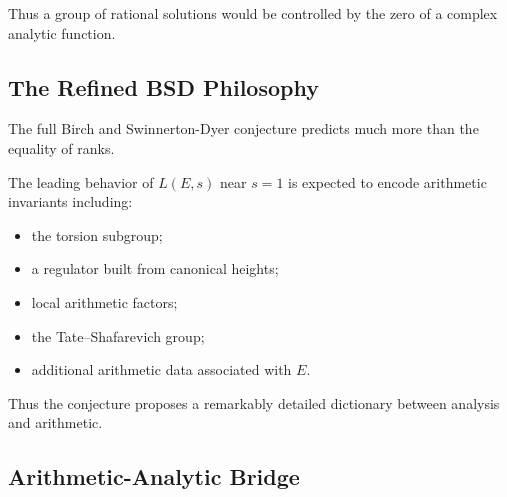 Thus a group of rational solutions would be controlled by the zero of a
complex analytic function.

\subsection{The Refined BSD Philosophy}
\label{subsec:refined-bsd-philosophy}

The full Birch and Swinnerton-Dyer conjecture predicts much more than the
equality of ranks.

The leading behavior of \(L(E,s)\) near \(s=1\) is expected to encode
arithmetic invariants including:

\begin{itemize}
    \item the torsion subgroup;
    \item a regulator built from canonical heights;
    \item local arithmetic factors;
    \item the Tate--Shafarevich group;
    \item additional arithmetic data associated with \(E\).
\end{itemize}

Thus the conjecture proposes a remarkably detailed dictionary between
analysis and arithmetic.

\subsection{Arithmetic-Analytic Bridge}
\label{subsec:arithmetic-analytic-bridge}

\begin{centereddiagram}
\end{centereddiagram}

